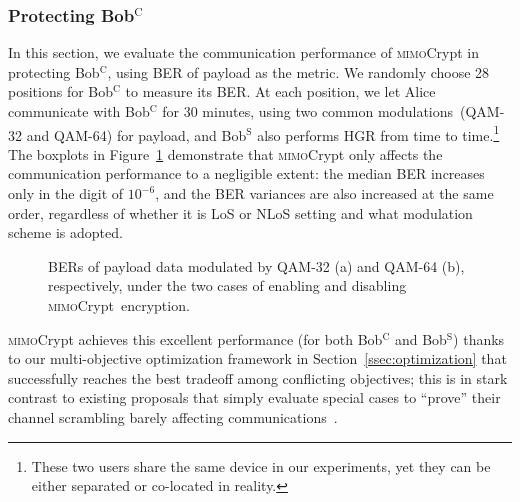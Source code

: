 \documentclass[conference,compsoc]{IEEEtran}
\newcommand{\sname}{\textsc{mimo}Crypt\xspace}
\begin{document}
\subsubsection{Protecting Bob$^{\mathrm{C}}$}\label{sssec:legalcommunication}
%
In this section, we evaluate the communication performance of \sname in protecting Bob$^{\mathrm{C}}$, using BER of payload as the metric. We randomly choose 28 positions for Bob$^{\mathrm{C}}$ to measure its BER. At each position, we let Alice communicate with  Bob$^{\mathrm{C}}$ for 30 minutes, using two common modulations~(QAM-32 and QAM-64) for payload, and Bob$^{\mathrm{S}}$ also performs HGR from time to time.\footnote{These two users share the same device in our experiments, yet they can be either separated or co-located in reality.} The boxplots in Figure~\ref{fig:overall_communication} demonstrate that \sname only affects the communication performance to a negligible extent: the median BER increases only in the digit of $10^{-6}$, and the BER variances are also increased at the same order, regardless of whether it is LoS or NLoS setting and what modulation scheme is adopted. 
%
\begin{figure}[t]
	\setlength\abovecaptionskip{8pt}
	\vspace{-2ex}
	\centering
	\caption{BERs of payload data modulated by QAM-32 (a) and QAM-64 (b), respectively, under the two cases of enabling and disabling \sname\ encryption.}
	\label{fig:overall_communication}
	\vspace{-.5ex}
\end{figure}
%
\sname achieves this excellent performance (for both Bob$^{\mathrm{C}}$ and Bob$^{\mathrm{S}}$) thanks to our multi-objective optimization framework in Section~\ref{ssec:optimization} that successfully reaches the best tradeoff among conflicting objectives; this is in stark contrast to existing proposals that simply evaluate special cases to ``prove'' their channel scrambling barely affecting communications~\cite{PhyCloak-NSDI16,IRShield-SP22}.
\end{document}

